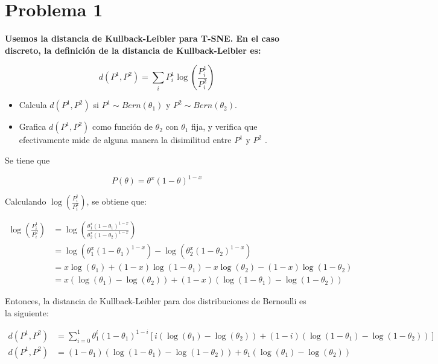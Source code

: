 \section*{Problema 1}

\textbf{Usemos la distancia de Kullback-Leibler para T-SNE. En el caso discreto, la definición de la distancia de Kullback-Leibler es:}

\begin{equation*}
    d(P^1,P^2) = \sum_i P^1_i \log \left (\frac{P^1_i}{P^2_i} \right )
\end{equation*}

\begin{itemize}
    \item Calcula $d(P^1,P^2)$ si $P^1\sim Bern(\theta_1)$ y $P^2 \sim Bern(\theta_2)$.
    \item Grafica $d(P^1 , P^2)$ como función de $\theta_2$ con $\theta_1$ fija, y verifica que efectivamente mide de alguna manera la disimilitud entre $P^1$ y $P^2$ .
\end{itemize}

Se tiene que

\begin{equation*}
    P(\theta) = \theta^x (1-\theta)^{1-x}
\end{equation*}

Calculando $ \log \left (\frac{P^1_i}{P^2_i} \right )$, se obtiene que:

\begin{align*}
    \log \left (\frac{P^1_i}{P^2_i} \right ) & = \log \left (\frac{\theta_1^x (1-\theta_1)^{1-x}}{\theta_2^x (1-\theta_2)^{1-x}} \right )                   \\
                                             & = \log \left (\theta_1^x (1-\theta_1)^{1-x} \right ) - \log \left (\theta_2^x (1-\theta_2)^{1-x}\right )     \\
                                             & = x \log (\theta_1) + (1-x) \log (1-\theta_1) -x \log (\theta_2) - (1-x) \log (1-\theta_2)                   \\
                                             & = x \left(\log (\theta_1)-\log (\theta_2)\right) + (1-x) \left (\log (1-\theta_1)-\log (1-\theta_2) \right )
\end{align*}

Entonces, la distancia de Kullback-Leibler para dos distribuciones de Bernoulli es la siguiente:

\begin{align*}
    d(P^1,P^2) & = \sum_{i=0}^1 \theta_1^i (1-\theta_1)^{1-i}\left [ i \left(\log (\theta_1)-\log (\theta_2)\right) + (1-i) \left (\log (1-\theta_1)-\log (1-\theta_2) \right ) \right ] \\
    d(P^1,P^2) & = (1-\theta_1) \left ( \log (1-\theta_1)- \log (1-\theta_2)\right ) + \theta_1 \left (\log (\theta_1)-\log (\theta_2) \right )
\end{align*}

